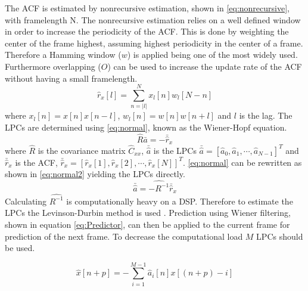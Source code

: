 The ACF is estimated by nonrecursive estimation, shown in \autoref{eq:nonrecursive}, with framelength N. The nonrecursive estimation relies on a well defined window in order to increase the periodicity of the ACF. This is done by weighting the center of the frame highest, assuming highest periodicity in the center of a frame. Therefore a Hamming window ($w$) is applied being one of the most widely used. Furthermore overlapping ($O$) can be used to increase the update rate of the ACF without having a small framelength.  
\begin{equation}\label{eq:nonrecursive}
\hat{r}_x[l] = \sum^{N}_{n=\left| l\right|} x_l[n]w_l[N-n]
\end{equation}
where $x_l[n]=x[n]x[n-l]$, $w_l[n]=w[n]w[n+l]$ and $l$ is the lag. The LPCs are determined using \autoref{eq:normal}, known as the Wiener-Hopf equation.
\begin{equation}\label{eq:normal}
\hat{R}  \bar{a} = -\bar{\hat{r}}_x
\end{equation}
where $\hat{R}$ is the covariance matrix $\hat{C}_{xx}$, $\bar{\hat{a}}$ is the LPCs $\bar{\hat{a}} = [\hat{a}_0 , \hat{a}_1, \cdots, \hat{a}_{N-1}]^T$ and $\bar{\hat{r}}_x$ is the ACF, $\bar{\hat{r}}_x = [\hat{r}_x[1] , \hat{r}_x[2], \cdots, \hat{r}_x[N]]^T$. \autoref{eq:normal} can be rewritten as shown in \autoref{eq:normal2} yielding the LPCs directly.  
 \begin{equation}\label{eq:normal2}
\bar{\hat{a}} = \hat{-R^{-1}} \bar{\hat{r}}_x
\end{equation}
Calculating $\hat{R^{-1}}$ is computationally heavy on a DSP. Therefore to estimate the LPCs the Levinson-Durbin method is used \cite{LinearPrediction}. Prediction using Wiener filtering, shown in equation \ref{eq:Predictor}, can then be applied to the current frame for prediction of the next frame. To decrease the computational load $M$ LPCs should be used. 

\begin{equation}\label{eq:Predictor}
\hat{x}[n+p] =- \sum^{M-1}_{i=1}\hat{a}_i[n]x[(n+p)-i]
\end{equation}

